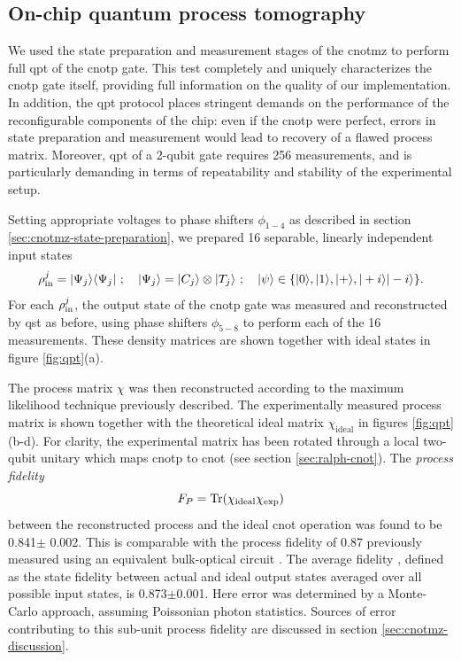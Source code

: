 \subsection{On-chip quantum process tomography}
\label{sec:expt-process-tomo}
We used the state preparation and measurement stages of the \gls{cnotmz} to perform full \gls{qpt} of the \gls{cnotp} gate. This test completely and uniquely characterizes the \gls{cnotp} gate itself, providing full information on the quality of our implementation. In addition, the \gls{qpt} protocol places stringent demands on the performance of the reconfigurable components of the chip: even if the \gls{cnotp} were perfect, errors in state preparation and measurement would lead to recovery of a flawed process matrix. Moreover, \gls{qpt} of a 2-qubit gate requires 256 measurements, and is particularly demanding in terms of repeatability and stability of the experimental setup.

Setting appropriate voltages to phase shifters $\phi_{1-4}$ as described in section \ref{sec:cnotmz-state-preparation}, we prepared 16 separable, linearly independent input states 
\begin{equation}
\rho^j_{\mathrm{in}} = \mbox{$ | \Psi_j \rangle $}{\mbox{$ \langle \Psi_j | $}}~ ; \quad
\mbox{$ | \Psi_j \rangle $}=\mbox{$ | C_j \rangle $}\otimes \mbox{$ | T_j \rangle $}~ ; \quad
\mbox{$ | \psi \rangle $} \in \{\mbox{$ | 0 \rangle $}, \mbox{$ | 1 \rangle $}, \mbox{$ | + \rangle $}, \mbox{$ | +i \rangle $} \mbox{$ | -i \rangle $} \}.
\end{equation}
For each $\rho^j_{\mathrm{in}}$, the output state of the \acrshort{cnotp} gate was measured and reconstructed by \gls{qst} as before, using phase shifters $\phi_{5-8}$ to perform each of the 16 measurements. These density matrices are shown together with ideal states in figure \ref{fig:qpt}(a).

The process matrix $\chi$ was then reconstructed according to the maximum likelihood technique previously described.
The experimentally measured process matrix is shown together with the theoretical ideal matrix $\chi_\mathrm{ideal}$ in figures \ref{fig:qpt}(b-d). For clarity, the experimental matrix has been rotated through a local two-qubit unitary which maps \gls{cnotp} to \gls{cnot} (see section \ref{sec:ralph-cnot}). The \emph{process fidelity} \cite{Nielsen2004}
\begin{equation}
F_{P} = \textrm{Tr}(\chi_\text{ideal}\chi_\text{exp})
\end{equation}
between the reconstructed process and the ideal \gls{cnot} operation was found to be 
0.841$\pm$ 0.002. 
This is comparable with the process fidelity of 0.87 previously measured using an equivalent bulk-optical circuit \cite{OBrien2004}. 
The average fidelity \cite{Gilchrist2009}, defined as the state fidelity between actual and ideal output states averaged over all possible input states, is 0.873$\pm$0.001. 
Here error was determined by a Monte-Carlo approach, assuming Poissonian photon statistics. 
Sources of error contributing to this sub-unit process fidelity are discussed in section \ref{sec:cnotmz-discussion}.

